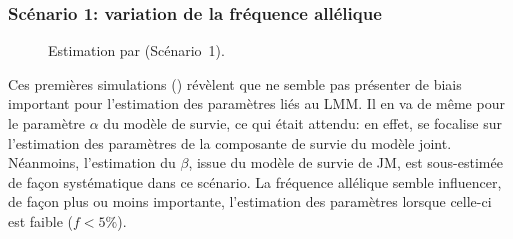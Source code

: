 \documentclass[11pt, a4paper]{article}
\begin{document}
\subsubsection{Scénario 1: variation de la fréquence allélique\label{sec:S1}}
\begin{figure}[ht]
    \begin{center}
    \end{center}
    \vspace{-15pt}
    \caption{Estimation par  (Scénario~1).}
    \label{fig:S1JM}
\end{figure}
\par{Ces premières simulations () révèlent que  ne semble pas présenter de biais
important pour l’estimation des paramètres liés au LMM.
Il en va de même pour le paramètre $\alpha$ du modèle de survie, ce qui était attendu: en effet,
 se focalise sur l’estimation des paramètres de la composante de survie du modèle joint.
Néanmoins, l’estimation du $\beta$, issue du modèle de survie de JM, est sous-estimée de façon systématique dans ce scénario.
La fréquence allélique semble influencer, de façon plus ou moins importante, l'estimation des paramètres lorsque celle-ci est faible ($f<5\%$).}
\end{document}
